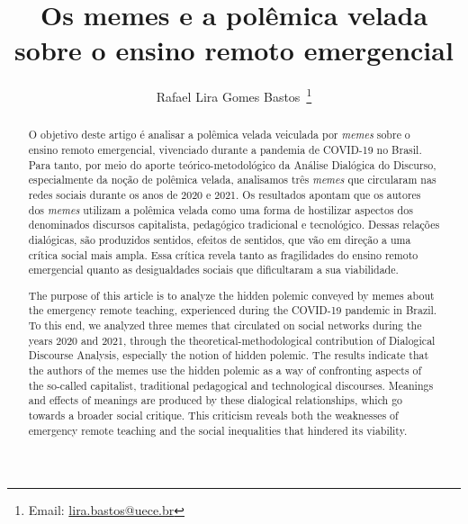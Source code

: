 \documentclass[portuguese]{textolivre}
\title{Os memes e a polêmica velada sobre o ensino remoto emergencial}
\author[1]{Rafael Lira Gomes Bastos~\orcid{0000-0002-6828-5976}\thanks{Email: \href{mailto:lira.bastos@uece.br}{lira.bastos@uece.br}}}
\affil[1]{Universidade Estadual do Ceará, Faculdade de Educação e Ciências Integradas do Litoral Leste, Fortaleza, CE, Brasil.}
\begin{document}
	
\maketitle
	
\begin{polyabstract}
\begin{abstract}
O objetivo deste artigo é analisar a polêmica velada veiculada por \textit{memes} sobre o ensino remoto emergencial, vivenciado durante a pandemia de COVID-19 no Brasil. Para tanto, por meio do aporte teórico-metodológico da Análise Dialógica do Discurso, especialmente da noção de polêmica velada, analisamos três \textit{memes} que circularam nas redes sociais durante os anos de 2020 e 2021. Os resultados apontam que os autores dos \textit{memes} utilizam a polêmica velada como uma forma de hostilizar aspectos dos denominados discursos capitalista, pedagógico tradicional e tecnológico. Dessas relações dialógicas, são produzidos sentidos, efeitos de sentidos, que vão em direção a uma crítica social mais ampla. Essa crítica revela tanto as fragilidades do ensino remoto emergencial quanto as desigualdades sociais que dificultaram a sua viabilidade.
			
\end{abstract}
		
\begin{english}
\begin{abstract}
The purpose of this article is to analyze the hidden polemic conveyed by memes about the emergency remote teaching, experienced during the COVID-19 pandemic in Brazil. To this end, we analyzed three memes that circulated on social networks during the years 2020 and 2021, through the theoretical-methodological contribution of Dialogical Discourse Analysis, especially the notion of hidden polemic. The results indicate that the authors of the memes use the hidden polemic as a way of confronting aspects of the so-called capitalist, traditional pedagogical and technological discourses. Meanings and effects of meanings are produced by these dialogical relationships, which go towards a broader social critique. This criticism reveals both the weaknesses of emergency remote teaching and the social inequalities that hindered its viability.
				
\end{abstract}
\end{english}
\end{polyabstract}
	
\end{document}
